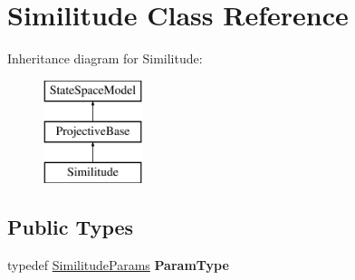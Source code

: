 \hypertarget{classSimilitude}{\section{Similitude Class Reference}
\label{classSimilitude}
}
Inheritance diagram for Similitude\-:\begin{figure}[H]
\begin{center}
\leavevmode
\includegraphics[height=3.000000cm]{classSimilitude}
\end{center}
\end{figure}
\subsection*{Public Types}
\begin{DoxyCompactItemize}
\item 
\hypertarget{classSimilitude_a1d3c95c60771c37d0834456c4f602b59}{typedef \hyperlink{structSimilitudeParams}{Similitude\-Params} {\bfseries Param\-Type}}\label{classSimilitude_a1d3c95c60771c37d0834456c4f602b59}

\end{DoxyCompactItemize}
